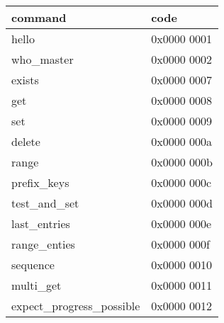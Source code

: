 \begin{table}[ht]
\begin{tabular}{ll}
command & code \\
\hline
hello          & 0x0000 0001 \\
who\_master    & 0x0000 0002 \\
exists         & 0x0000 0007 \\
get            & 0x0000 0008 \\
set            & 0x0000 0009 \\
delete         & 0x0000 000a \\
range          & 0x0000 000b \\
prefix\_keys   & 0x0000 000c \\
test\_and\_set & 0x0000 000d \\
last\_entries  & 0x0000 000e \\
range\_enties  & 0x0000 000f \\
sequence       & 0x0000 0010 \\
multi\_get     & 0x0000 0011 \\
expect\_progress\_possible & 0x0000 0012 \\
\hline
\end{tabular}
\end{table}
